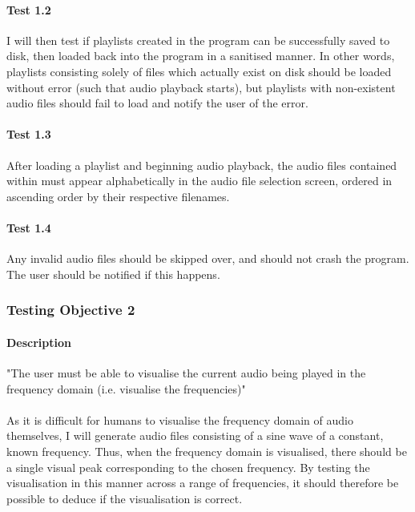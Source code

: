 \paragraph{Test 1.2}
I will then test if playlists created in the program can be successfully saved to disk, then loaded back into the program in a sanitised manner. In other words, playlists consisting solely of files which actually exist on disk should be loaded without error (such that audio playback starts), but playlists with non-existent audio files should fail to load and notify the user of the error.

\paragraph{Test 1.3}
After loading a playlist and beginning audio playback, the audio files contained within must appear alphabetically in the audio file selection screen, ordered in ascending order by their respective filenames.

\paragraph{Test 1.4}
Any invalid audio files should be skipped over, and should not crash the program. The user should be notified if this happens.

\pagebreak
\subsubsection{Testing Objective 2}
\paragraph{Description} "The user must be able to visualise the current audio being played in the frequency domain (i.e. visualise the frequencies)"

\paragraph{}
As it is difficult for humans to visualise the frequency domain of audio themselves, I will generate audio files consisting of a sine wave of a constant, known frequency. Thus, when the frequency domain is visualised, there should be a single visual peak corresponding to the chosen frequency. By testing the visualisation in this manner across a range of frequencies, it should therefore be possible to deduce if the visualisation is correct.

